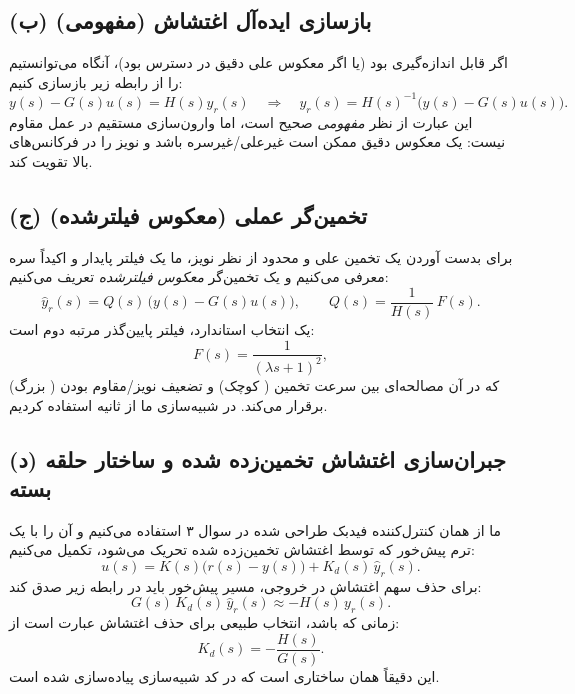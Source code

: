 \documentclass[a4paper]{article}
\begin{document}
\subsection{(ب) بازسازی ایده‌آل اغتشاش (مفهومی)}
اگر  قابل اندازه‌گیری بود (یا اگر معکوس علی دقیق  در دسترس بود)، آنگاه می‌توانستیم  را از رابطه زیر بازسازی کنیم:
\begin{equation}
	y(s)-G(s)u(s)=H(s)y_r(s)
	\quad\Rightarrow\quad
	y_r(s)=H(s)^{-1}\bigl(y(s)-G(s)u(s)\bigr).
\end{equation}
این عبارت از نظر \emph{مفهومی} صحیح است، اما وارون‌سازی مستقیم در عمل مقاوم  نیست: یک معکوس دقیق ممکن است غیرعلی/غیرسره  باشد و نویز را در فرکانس‌های بالا تقویت کند.

\subsection{(ج) تخمین‌گر عملی (معکوس فیلترشده)}
برای بدست آوردن یک تخمین علی و محدود از نظر نویز، ما یک فیلتر پایدار و اکیداً سره  معرفی می‌کنیم و یک تخمین‌گر \emph{معکوس فیلترشده} تعریف می‌کنیم:
\begin{equation}
	\hat y_r(s)=Q(s)\,\bigl(y(s)-G(s)u(s)\bigr),
	\qquad
	Q(s)=\frac{1}{H(s)}\,F(s).
\end{equation}
یک انتخاب استاندارد، فیلتر پایین‌گذر مرتبه دوم است:
\begin{equation}
	F(s)=\frac{1}{(\lambda s+1)^2},
\end{equation}
که در آن  مصالحه‌ای بین سرعت تخمین (\lr{$\lambda$} کوچک) و تضعیف نویز/مقاوم بودن (\lr{$\lambda$} بزرگ) برقرار می‌کند.
در شبیه‌سازی ما از  ثانیه استفاده کردیم.

\subsection{(د) جبران‌سازی اغتشاش تخمین‌زده شده و ساختار حلقه بسته}
ما از همان کنترل‌کننده فیدبک  طراحی شده در سوال ۳ استفاده می‌کنیم و آن را با یک ترم پیش‌خور  که توسط اغتشاش تخمین‌زده شده تحریک می‌شود، تکمیل می‌کنیم:
\begin{equation}
	u(s)=K(s)\bigl(r(s)-y(s)\bigr)+K_d(s)\,\hat y_r(s).
\end{equation}
برای حذف سهم اغتشاش  در خروجی، مسیر پیش‌خور باید در رابطه زیر صدق کند:
\begin{equation}
	G(s)\,K_d(s)\,\hat y_r(s)\approx -H(s)\,y_r(s).
\end{equation}
زمانی که  باشد، انتخاب طبیعی برای حذف اغتشاش عبارت است از:
\begin{equation}
	K_d(s)=-\frac{H(s)}{G(s)}.
\end{equation}
این دقیقاً همان ساختاری است که در کد شبیه‌سازی پیاده‌سازی شده است.
\end{document}
